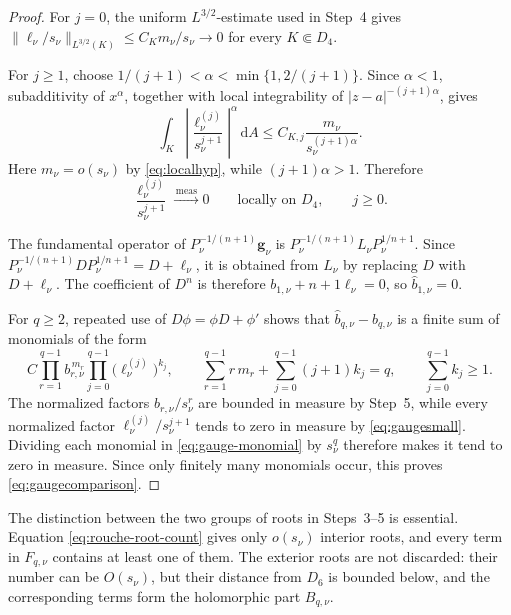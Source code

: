 \documentclass[12pt,letterpaper,reqno]{amsart}
\theoremstyle{definition}
\numberwithin{equation}{section}
\newcommand{\dA}{\,\mathrm dA}
\newcommand{\convmeas}{\xrightarrow{\,\mathrm{meas}\,}}
\newcommand{\gv}{\bm g}
\begin{document}
\begin{proof}
For \(j=0\), the uniform \(L^{3/2}\)-estimate used in Step~4 gives
\(\|\ell_\nu/s_\nu\|_{L^{3/2}(K)}
 \leq C_Km_\nu/s_\nu\to0\)
for every \(K\Subset D_4\).

For \(j\geq1\), choose
\(1/(j+1)<\alpha<\min\{1,2/(j+1)\}\).
Since \(\alpha<1\), subadditivity of \(x^\alpha\), together with local
integrability of
\(|z-a|^{-(j+1)\alpha}\), gives
\[
 \int_K
 \left|
 \frac{\ell_\nu^{(j)}}{s_\nu^{j+1}}
 \right|^\alpha
 \dA
 \leq
 C_{K,j}
 \frac{m_\nu}{s_\nu^{(j+1)\alpha}}.
\]
Here \(m_\nu=o(s_\nu)\) by \eqref{eq:localhyp}, while
\((j+1)\alpha>1\). Therefore
\begin{equation}\label{eq:gaugesmall}
 \frac{\ell_\nu^{(j)}}{s_\nu^{j+1}}
 \convmeas0
 \qquad\text{locally on }D_4,
 \qquad j\geq0.
\end{equation}

The fundamental operator of \(P_\nu^{-1/(n+1)}\gv_\nu\) is
\(P_\nu^{-1/(n+1)}L_\nu P_\nu^{1/{n+1}}\). Since
\(P_\nu^{-1/(n+1)}DP_\nu^{1/{n+1}}=D+\ell_\nu\), it is obtained from
\(L_\nu\) by replacing \(D\) with \(D+\ell_\nu\). The coefficient of
\(D^{n}\) is therefore
\(b_{1,\nu}+{n+1}\ell_\nu=0\), so
\(\widehat b_{1,\nu}=0\).

For \(q\geq2\), repeated use of
\(D\phi=\phi D+\phi'\) shows that
\(\widehat b_{q,\nu}-b_{q,\nu}\) is a finite sum of monomials of the
form
\begin{equation}\label{eq:gauge-monomial}
 C
 \prod_{r=1}^{q-1}b_{r,\nu}^{\,m_r}
 \prod_{j=0}^{q-1}
 \bigl(\ell_\nu^{(j)}\bigr)^{k_j},
 \qquad
 \sum_{r=1}^{q-1}r\,m_r
 +
 \sum_{j=0}^{q-1}(j+1)k_j
 =
 q,
 \qquad
 \sum_{j=0}^{q-1}k_j\geq1.
\end{equation}
The normalized factors \(b_{r,\nu}/s_\nu^r\) are bounded in measure
by Step~5, while every normalized factor
\(\ell_\nu^{(j)}/s_\nu^{j+1}\) tends to zero in measure by
\eqref{eq:gaugesmall}. Dividing each monomial in
\eqref{eq:gauge-monomial} by \(s_\nu^q\) therefore makes it tend to
zero in measure. Since only finitely many monomials occur, this proves
\eqref{eq:gaugecomparison}.
\end{proof}

The distinction between the two groups of roots in Steps~3--5 is
essential. Equation \eqref{eq:rouche-root-count} gives only
\(o(s_\nu)\) interior roots, and every term in \(F_{q,\nu}\) contains
at least one of them. The exterior roots are not discarded: their
number can be \(O(s_\nu)\), but their distance from \(D_6\) is bounded
below, and the corresponding terms form the holomorphic part
\(B_{q,\nu}\).
\end{document}
